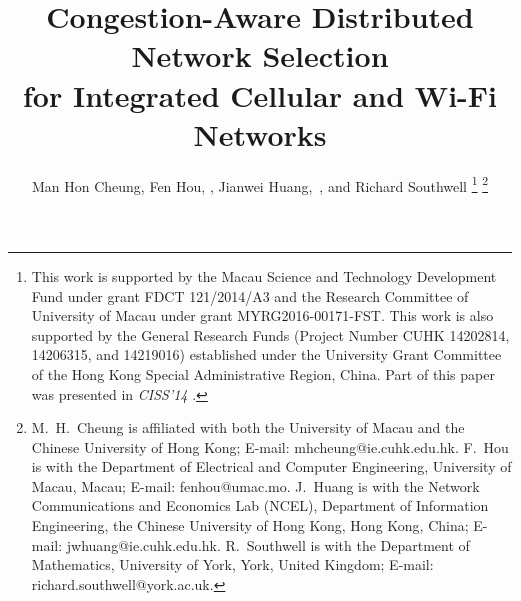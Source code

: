 \documentclass[journal]{IEEEtran}
\begin{document}



\title{Congestion-Aware Distributed Network Selection \\ for Integrated Cellular and Wi-Fi Networks}

\author{Man Hon Cheung, Fen Hou, , Jianwei Huang,~, and Richard Southwell
\thanks{
This work is supported by the Macau Science and Technology Development Fund under grant FDCT 121/2014/A3 and the Research Committee of University of Macau under grant MYRG2016-00171-FST. This work is also supported by the General Research Funds (Project Number CUHK 14202814, 14206315, and 14219016) established under the University Grant Committee of the Hong Kong Special Administrative Region, China.
 Part of this paper was presented in \emph{CISS'14} \cite{cheung_ca14}.}%
\thanks{M.~H.~Cheung is affiliated with both the University of Macau and the Chinese University of Hong Kong; E-mail: mhcheung@ie.cuhk.edu.hk.
F.~Hou is with the Department of Electrical and Computer Engineering, University of Macau, Macau; E-mail: fenhou@umac.mo.
J.~Huang is with the Network Communications and Economics Lab (NCEL), Department of Information Engineering, the Chinese University of Hong Kong, Hong Kong, China; E-mail: jwhuang@ie.cuhk.edu.hk.
R.~Southwell is with the Department of Mathematics, University of York, York, United Kingdom; E-mail: richard.southwell@york.ac.uk.}
}







\maketitle

\thispagestyle{empty}
\end{document}
